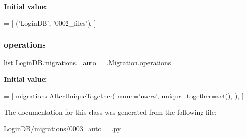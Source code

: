 {\bfseries Initial value\+:}
\begin{DoxyCode}
=  [
        (\textcolor{stringliteral}{'LoginDB'}, \textcolor{stringliteral}{'0002\_files'}),
    ]
\end{DoxyCode}
\mbox{\label{class_login_d_b_1_1migrations_1_10003__auto__20201206__1730_1_1_migration_a1b76c1a482a06f294d6e9568b027dcc5}} 
\subsubsection{\texorpdfstring{operations}{operations}}
{\footnotesize\ttfamily list Login\+D\+B.\+migrations.\+\_\+auto\+\_\+\_.\+Migration.\+operations\hspace{0.3cm}{\ttfamily [static]}}

{\bfseries Initial value\+:}
\begin{DoxyCode}
=  [
        migrations.AlterUniqueTogether(
            name=\textcolor{stringliteral}{'users'},
            unique\_together=set(),
        ),
    ]
\end{DoxyCode}


The documentation for this class was generated from the following file\+:\begin{DoxyCompactItemize}
\item 
Login\+D\+B/migrations/\hyperlink{0003__auto__20201206__1730_8py}{0003\+\_\+auto\+\_\+\_.\+py}\end{DoxyCompactItemize}
